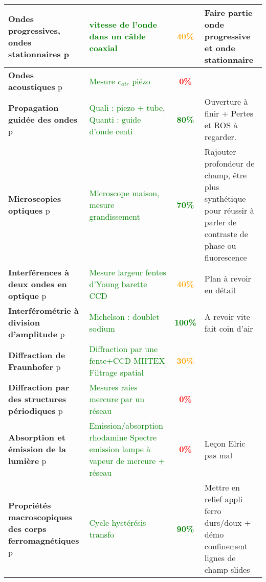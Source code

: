 \begin{changemargin}{-1.5cm}{-0cm}
\begin{center}
\begin{tabularx}{\paperwidth-2cm}{| X | X | c | X |}
\hline
  \textbf{Ondes progressives, ondes stationnaires} p\pageref{LP_OndesProgressives}~& \textcolor{green}{vitesse de l'onde dans un câble coaxial} & \textcolor{orange}{\textbf{40\%}} & Faire partie onde progressive et onde stationnaire \\
  \hline
  \textbf{Ondes acoustiques} p\pageref{LP_OndeAcoustique}~& \textcolor{green}{Mesure $c_{air}$ piézo} & \textcolor{red}{\textbf{0\%}} &  \\
  \hline
  \textbf{Propagation guidée des ondes} p\pageref{LP_PropagationGuidee} & \textcolor{green}{Quali : piezo + tube}, \textcolor{green}{Quanti : guide d'onde centi}& \textcolor{green}{\textbf{80\%}} & Ouverture à finir + Pertes et ROS à regarder. \\
  \hline
  \textbf{Microscopies optiques} p\pageref{LP_Microscopie}~& \textcolor{green}{Microscope maison, mesure grandissement}~& \textcolor{green}{\textbf{70\%}} & Rajouter profondeur de champ, être plus synthétique pour réussir à parler de contraste de phase ou fluorescence \\
  \hline
  \textbf{Interférences à deux ondes en optique} p\pageref{LP_InterferencesDeuxOndes}~& \textcolor{green}{Mesure largeur fentes d'Young barette CCD} & \textcolor{orange}{\textbf{40\%}} & Plan à revoir en détail\\
  \hline
  \textbf{Interférométrie à division d'amplitude} p\pageref{LP_DivisionAmplitude} & \textcolor{green}{Michelson : doublet sodium} & \textcolor{green}{\textbf{100\%}} & A revoir vite fait coin d'air \\
  \hline
  \textbf{Diffraction de Fraunhofer} p\pageref{LP_DiffractionFraunhofer} & \textcolor{green}{Diffraction par une fente+CCD-MHTEX} \textcolor{green}{Filtrage spatial} & \textcolor{orange}{\textbf{30\%}} &  \\
  \hline
  \textbf{Diffraction par des structures périodiques} p\pageref{LP_DiffractionPeriodique} & \textcolor{green}{Mesures raies mercure par un réseau} & \textcolor{red}{\textbf{0\%}} &  \\
  \hline
  \textbf{Absorption et émission de la lumière} p\pageref{LP_Absorption} & \textcolor{green}{Emission/absorption rhodamine} \textcolor{green}{Spectre emission lampe à vapeur de mercure + réseau} & \textcolor{red}{\textbf{0\%}} & Leçon Elric pas mal \\
  \hline
  \hline
  \textbf{Propriétés macroscopiques des corps ferromagnétiques } p\pageref{LP_Ferromagnetisme} & \textcolor{green}{Cycle hystérésis transfo} & \textcolor{green}{\textbf{90\%}} & Mettre en relief appli ferro durs/doux + démo confinement lignes de champ slides \\

\end{tabularx}
\end{center}
\end{changemargin}

